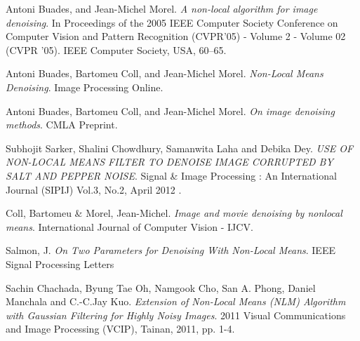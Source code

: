 \documentclass[11pt,letterpaper]{article}
\begin{document}
\begin{thebibliography}{9}
Antoni Buades, and Jean-Michel Morel.
\textit{A non-local algorithm for image denoising}.
In Proceedings of the 2005 IEEE Computer Society Conference on Computer Vision and Pattern Recognition (CVPR’05) - Volume 2 - Volume 02 (CVPR ’05). IEEE Computer Society, USA, 60–65.

Antoni Buades, Bartomeu Coll, and Jean-Michel Morel.
\textit{Non-Local Means Denoising}.
Image Processing Online.

Antoni Buades, Bartomeu Coll, and Jean-Michel Morel.
\textit{On image denoising methods}.
CMLA Preprint.

Subhojit Sarker, Shalini Chowdhury, Samanwita Laha and Debika Dey.
\textit{USE OF NON-LOCAL MEANS FILTER TO DENOISE IMAGE CORRUPTED BY SALT AND PEPPER NOISE}.
Signal \& Image Processing : An International Journal (SIPIJ) Vol.3, No.2, April 2012 .

Coll, Bartomeu \& Morel, Jean-Michel.
\textit{Image and movie denoising by nonlocal means}. International Journal of Computer Vision - IJCV. 

Salmon, J.
\textit{On Two Parameters for Denoising With Non-Local Means}.
IEEE Signal Processing Letters

Sachin Chachada, Byung Tae Oh, Namgook Cho, San A. Phong, Daniel Manchala and C.-C.Jay Kuo.
\textit{Extension of Non-Local Means (NLM) Algorithm with
	Gaussian Filtering for Highly Noisy Images}.
2011 Visual Communications and Image Processing (VCIP), Tainan, 2011, pp. 1-4.

\end{thebibliography}
\end{document}
